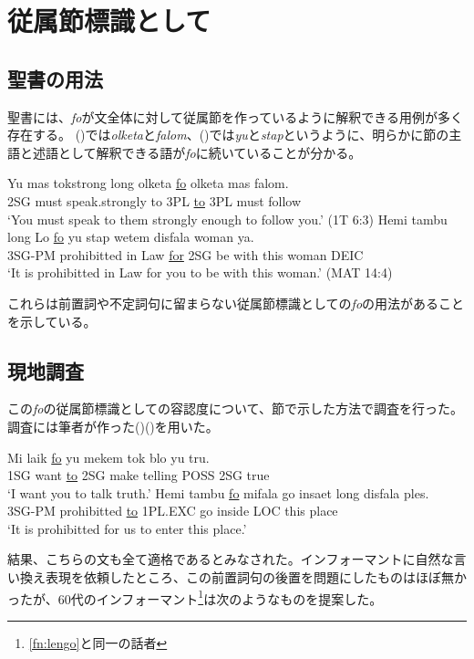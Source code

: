 \section{従属節標識として}
\subsection{聖書の用法}
聖書には、\textit{fo}が文全体に対して従属節を作っているように解釈できる用例が多く存在する。
()では\textit{olketa}と\textit{falom}、()では\textit{yu}と\textit{stap}というように、明らかに節の主語と述語として解釈できる語が\textit{fo}に続いていることが分かる。

\begin{exe}
\ex
\gll Yu mas tokstrong long olketa \underline{fo} olketa mas falom.\\
2SG must speak.strongly to 3PL \underline{to} 3PL must follow\\
\glt `You must speak to them strongly enough to follow you.' (1T 6:3)
\ex
\gll Hemi tambu long Lo \underline{fo} yu stap wetem disfala woman ya.\\
3SG-PM prohibitted in Law \underline{for} 2SG be with this woman DEIC\\
\glt `It is prohibitted in Law for you to be with this woman.' (MAT 14:4)
\end{exe}

これらは前置詞や不定詞句に留まらない従属節標識としての\textit{fo}の用法があることを示している。

\subsection{現地調査}
この\textit{fo}の従属節標識としての容認度について、\label{sec:howexamined}節で示した方法で調査を行った。調査には筆者が作った()()を用いた。

\begin{exe}
\ex
\gll Mi laik \underline{fo} yu mekem tok blo yu tru.\\
1SG want \underline{to} 2SG make telling POSS 2SG true\\
\glt `I want you to talk truth.'
\ex
\gll Hemi tambu \underline{fo} mifala go insaet long disfala ples.\\
3SG-PM prohibitted \underline{to} 1PL.EXC go inside LOC this place\\
\glt `It is prohibitted for us to enter this place.'
\end{exe}

結果、こちらの文も全て適格であるとみなされた。インフォーマントに自然な言い換え表現を依頼したところ、この前置詞句の後置を問題にしたものはほぼ無かったが、60代のインフォーマント\footnote{\ref{fn:lengo}と同一の話者}は次のようなものを提案した。

